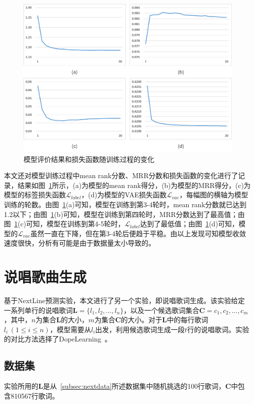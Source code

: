 \begin{figure}[h]
    \centering
    \includegraphics[width=14cm]{epoch.png}
    \caption{模型评价结果和损失函数随训练过程的变化}
    \label{fig:epoch}
\end{figure}

本文还对模型训练过程中mean rank分数、MRR分数和损失函数的变化进行了记录，结果如图~\ref{fig:epoch}所示，(a)为模型的mean rank得分，(b)为模型的MRR得分，(c)为模型的标签损失函数$\mathcal L_{label}$，(d)为模型的VAE损失函数$\mathcal L_{vae}$，每幅图的横轴为模型训练的轮数。由图~\ref{fig:epoch}(a)可知，模型在训练到第3-4轮时，mean rank分数就已达到1.2以下；由图~\ref{fig:epoch}(b)可知，模型在训练到第四轮时，MRR分数达到了最高值；由图~\ref{fig:epoch}(c)可知，模型在训练到第4-5轮时，$\mathcal L_{label}$达到了最低值；由图~\ref{fig:epoch}(d)可知，模型的$\mathcal L_{vae}$虽然一直在下降，但在第3-4轮后便趋于平稳。由以上发现可知模型收敛速度很快，分析有可能是由于数据量太小导致的。\par

\section{说唱歌曲生成}
基于NextLine预测实验，本文进行了另一个实验，即说唱歌词生成。该实验给定一系列单行的说唱歌词$\bm L = \{l_1, l_2, ... , l_n\}$，以及一个候选歌词集合$\bm C = {c_1, c_2, ..., c_m}$，其中，$n$为集合$\bm L$的大小，$m$为集合$\bm C$的大小。对于$\bm L$中的每行歌词$l_i~(1 \leq i \leq n)$，模型需要从$l_i$出发，利用候选歌词生成一段$t$行的说唱歌词。实验的对比方法选择了DopeLearning~\autocite{Malmi2016dopelearning}。\par

\subsection{数据集}
实验所用的$\bm L$是从~\ref{subsec:nextdata}所述数据集中随机挑选的100行歌词，$\bm C$中包含810567行歌词。\par

